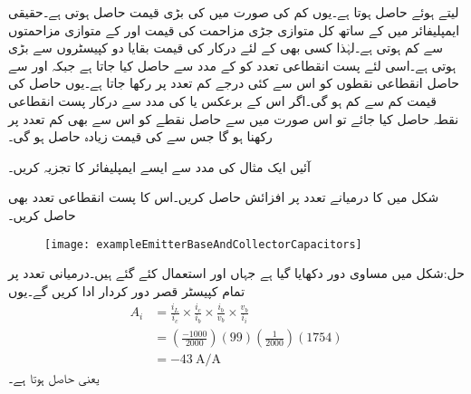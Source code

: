  لیتے ہوئے   حاصل ہوتا ہے۔یوں کم  کی صورت میں  کی بڑی قیمت حاصل ہوتی ہے۔حقیقی ایمپلیفائر میں  کے ساتھ کل متوازی جڑی مزاحمت کی قیمت  اور  کے متوازی مزاحمتوں سے کم ہوتی ہے۔لہٰذا کسی بھی  کے لئے درکار  کی قیمت بقایا دو کپیسٹروں سے بڑی ہوتی ہے۔اسی لئے پست انقطاعی تعدد کو  کے مدد سے حاصل کیا جاتا ہے جبکہ  اور  سے حاصل انقطاعی نقطوں  کو اس سے کئی درجے کم تعدد پر رکھا جاتا ہے۔یوں حاصل  کی قیمت کم سے کم ہو گی۔اگر اس کے برعکس  یا  کی مدد سے درکار پست انقطاعی نقطہ حاصل کیا جائے تو اس صورت میں  سے حاصل نقطے  کو اس سے بھی کم تعدد پر رکھنا ہو گا جس سے  کی قیمت زیادہ حاصل ہو گی۔

آئیں ایک مثال کی مدد سے ایسے ایمپلیفائر  کا تجزیہ کریں۔

شکل  میں  کا درمیانے تعدد پر افزائش  حاصل کریں۔اس کا پست انقطاعی تعدد بھی حاصل کریں۔

\begin{figure}
\centering
\texttt{[image: exampleEmitterBaseAndCollectorCapacitors]}
\caption{}
\label{شکل_تعددی_ردعمل_مثال_قابو_مخارج_اور_محاصل_کپیسٹر}
\end{figure}

حل:شکل  میں مساوی دور دکھایا گیا ہے جہاں  اور  استعمال کئے گئے ہیں۔درمیانی تعدد پر تمام کپیسٹر قصر دور کردار ادا کریں گے۔یوں
\begin{align*}
A_i&=\frac{i_L}{i_c} \times \frac{i_c}{i_b} \times  \frac{i_b}{v_b} \times \frac{v_b}{i_i} \\
  &=\left(\frac{-1000}{2000}\right) \left( 99\right) \left( \frac{1}{2000}\right)\left(1754\right) \\
&=\SI[per=frac,fraction=nice]{-43}{\ampere \per \ampere}
\end{align*}
یعنی  حاصل ہوتا ہے۔

